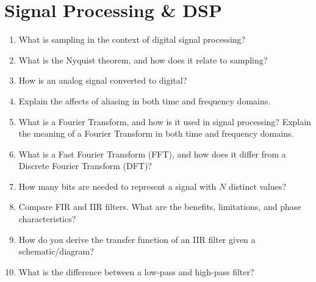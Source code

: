 \documentclass[11pt]{article}
\begin{document}
\section{Signal Processing \& DSP}
\begin{enumerate}
    \item What is sampling in the context of digital signal processing?
    \item What is the Nyquist theorem, and how does it relate to sampling?
    \item How is an analog signal converted to digital?
    \item Explain the affects of aliasing in both time and frequency domains.
    \item What is a Fourier Transform, and how is it used in signal processing?
    Explain the meaning of a Fourier Transform in both time and frequency
    domains.
    \item What is a Fast Fourier Transform (FFT), and how does it differ from a
    Discrete Fourier Transform (DFT)?
    \item How many bits are needed to represent a signal with \(N\) distinct
    values?
    \item Compare FIR and IIR filters. What are the benefits, limitations, and
    phase characteristics?
    \item How do you derive the transfer function of an IIR filter given a
    schematic/diagram?
    \item What is the difference between a low-pass and high-pass filter?
\end{enumerate}

\end{document}
